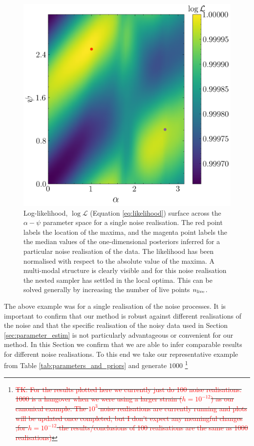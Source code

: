 \documentclass[fleqn,usenatbib,useAMS]{mnras}
\providecommand{\DIFdel}[1]{{\protect\color{red}\sout{#1}}}                      %
\providecommand{\DIFdelbegin}{} %
\newcommand{\DIFscaledelfig}{0.5}
\newlength{\DIFdelgraphicswidth} %
\newlength{\DIFdelgraphicsheight} %
\newcommand{\DIFdelincludegraphics}[2][]{%
\sbox{\DIFdelgraphicsbox}{\DIFOincludegraphics[#1]{#2}}%
\settoboxwidth{\DIFdelgraphicswidth}{\DIFdelgraphicsbox} %
\settoboxtotalheight{\DIFdelgraphicsheight}{\DIFdelgraphicsbox} %
\scalebox{\DIFscaledelfig}{%
\parbox[b]{\DIFdelgraphicswidth}{\usebox{\DIFdelgraphicsbox}\\[-\baselineskip] \rule{\DIFdelgraphicswidth}{0em}}\llap{\resizebox{\DIFdelgraphicswidth}{\DIFdelgraphicsheight}{%
\setlength{\unitlength}{\DIFdelgraphicswidth}%
\begin{picture}(1,1)%
\thicklines\linethickness{2pt} %
{\color[rgb]{1,0,0}\put(0,0){\framebox(1,1){}}}%
{\color[rgb]{1,0,0}\put(0,0){\line( 1,1){1}}}%
{\color[rgb]{1,0,0}\put(0,1){\line(1,-1){1}}}%
\end{picture}%
}\hspace*{3pt}}} %
} %
\DeclareRobustCommand{\DIFdelbegin}{\DIFOdelbegin \let\includegraphics\DIFdelincludegraphics} %
\begin{document}
\begin{figure}
	\centering
	\includegraphics[width=\columnwidth]{images/likelihood_surface_alpha_psi}
	\caption{Log-likelihood, $\log \mathcal{L}$ (Equation \ref{eq:likelihood}) surface across the $\alpha-\psi$ parameter space for a single noise realisation.  The red point labels the location of the maxima, and the magenta point labels the the median values of the one-dimensional posteriors inferred for a particular noise realisation of the data. The likelihood has been normalised with respect to the absolute value of the maxima. A multi-modal structure is clearly visible and for this noise realisation the nested sampler has settled in the local optima. This can be solved generally by increasing the number of live points $n_{\rm live}$.}
	\label{fig:likelihood_surface_alpha_psi}
\end{figure}
The above example was for a single realisation of the noise processes. It is important to confirm that our method is robust against different realisations of the noise and that the specific realisation of the noisy data used in Section \ref{sec:parameter_estim} is not particularly advantageous or convenient for our method. In this Section we confirm that we are able to infer comparable results for different noise realisations. To this end we take our representative example from Table \ref{tab:parameters_and_priors} and generate $1000$ \DIFdelbegin \footnote{%
\DIFdel{\textcolor{red}{TK: For the results plotted here we currently just do 100 noise realisations. 1000 is a hangover when we were using a larger strain ($h=10^{-12}$) as our canonical example. The $10^3$ noise realisations are currently running and plots will be updated once completed, but I don't expect any meaningful changes \textcolor{red}{;for $h=10^{-12}$ the results/conclusions of 100 realisations are the same as 1000 realisations)}}}%
} %
\end{document}
